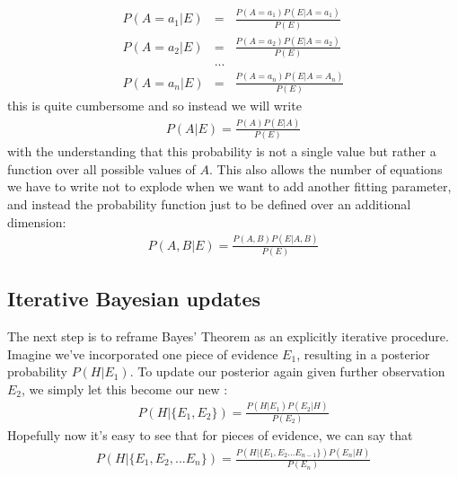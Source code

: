 \documentclass[letterpaper,10pt,english]{sphinxmanual}
\begin{document}
\begin{eqnarray}
  \label{equation:bayesics:bayesics:1}
P(A=a_1|E) &=& \frac{P(A=a_1)P(E|A=a_1)}{P(E)} \\
P(A=a_2|E) &=& \frac{P(A=a_2)P(E|A=a_2)}{P(E)} \\
&...& \\
P(A=a_n|E) &=& \frac{P(A=a_n)P(E|A=A_n)}{P(E)}
\end{eqnarray}
this is quite cumbersome and so instead we will write
\begin{equation}\label{equation:bayesics:bayesics:2}
\begin{split}P(A|E) = \frac{P(A)P(E|A)}{P(E)}\end{split}
\end{equation}
with the understanding that this probability is not a single value but rather a function over all possible values of \(A\). This also allows the number of equations we have to write not to explode when we want to add another fitting parameter, and instead the probability function just to be defined over an additional dimension:
\begin{equation}\label{equation:bayesics:bayesics:3}
\begin{split}P(A,B|E) = \frac{P(A,B)P(E|A,B)}{P(E)}\end{split}
\end{equation}

\subsection{Iterative Bayesian updates}
\label{\detokenize{bayesics:iterative-bayesian-updates}}
The next step is to reframe Bayes’ Theorem as an explicitly iterative procedure. Imagine we’ve incorporated one piece of evidence \(E_1\), resulting in a posterior probability \(P(H|E_1)\). To update our posterior again given further observation \(E_2\), we simply let this  become our new :
\begin{equation}\label{equation:bayesics:bayesics:4}
\begin{split}P(H|\{E_1,E_2\}) = \frac{P(H|E_1)P(E_2|H)}{P(E_2)}\end{split}
\end{equation}
Hopefully now it’s easy to see that for  pieces of evidence, we can say that
\begin{equation}\label{equation:bayesics:bayesics:5}
\begin{split}P(H|\{E_1,E_2,...E_n\}) = \frac{P(H|\{E_1,E_2...E_{n-1}\})P(E_n|H)}{P(E_n)}\end{split}
\end{equation}
\end{document}
